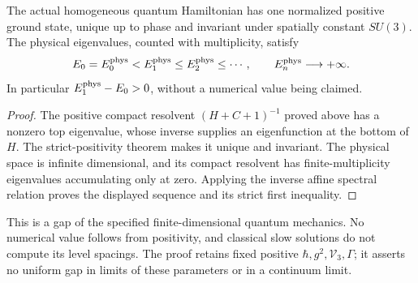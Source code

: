 \begin{corollary}
\label{qh:hq-ground}
The actual homogeneous quantum Hamiltonian has one normalized positive
ground state, unique up to phase and invariant under spatially constant
\(SU(3)\). The physical eigenvalues, counted with multiplicity, satisfy
\[
 E_0=E^{\rm phys}_0<E^{\rm phys}_1\leq E^{\rm phys}_2\leq\cdots,
 \qquad E^{\rm phys}_n\longrightarrow+\infty .
\]
In particular \(E^{\rm phys}_1-E_0>0\), without a numerical value being
claimed.
\end{corollary}
\begin{proof}
The positive compact resolvent $(H+C+1)^{-1}$ proved above has a nonzero top eigenvalue,
whose inverse supplies an eigenfunction at the bottom of \(H\).
The strict-positivity theorem makes it unique and invariant.
The physical space is infinite dimensional, and its compact
resolvent has finite-multiplicity eigenvalues accumulating only
at zero. Applying the inverse affine spectral relation proves
the displayed sequence and its strict first inequality.
\end{proof}
This is a gap of the specified finite-dimensional quantum mechanics.
No numerical value follows from positivity, and classical slow
solutions do not compute its level spacings. The proof retains fixed
positive \(\hbar,g^2,\mathcal V_3,\Gamma\); it asserts no uniform
gap in limits of these parameters or in a continuum limit.

